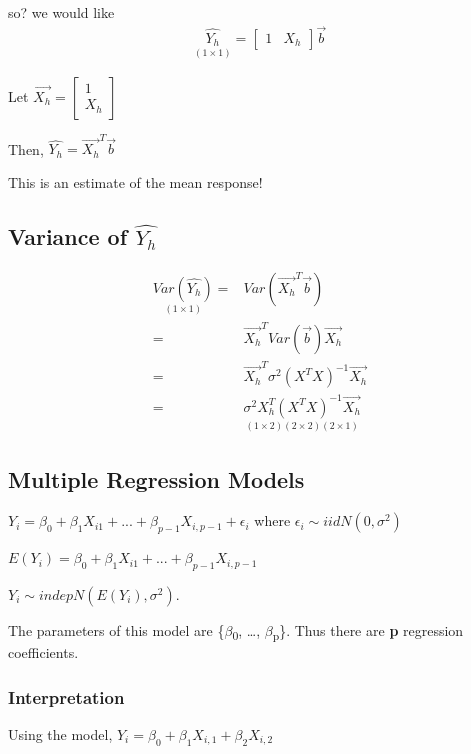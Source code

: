 \documentclass[11pt]{article}
\begin{document}
so? we would like
\begin{equation}
\begin{split}
\underset{(1 \times 1)}{\hat{Y_h}} = \begin{bmatrix}
1 & X_h
\end{bmatrix}
\vec{b}
\end{split}
\end{equation}


Let \(\vec{X_h} = \begin{bmatrix}
1\\
X_h
\end{bmatrix}\)

Then, \(\hat{Y_h} = \vec{X_h}^T \vec{b}\)

This is an estimate of the mean response!
\subsection{Variance of \(\hat{Y_h}\)}
\label{sec:orgf3d23de}
\begin{equation}
  \begin{split}
    \underset{(1 \times 1)}{Var(\hat{Y_h})} = & Var(\vec{X_h}^T \vec{b})\\
                                            = & \vec{X_h}^T Var(\vec{b}) \vec{X_h}\\
                                            = & \vec{X_h}^T \sigma^2(X^T X)^{-1} \vec{X_h}\\
                                            = & \underset{(1 \times 2)(2 \times 2)(2 \times 1)}{\sigma^2 X_h^T (X^T X)^{-1} \vec{X_h}}
  \end{split}
\end{equation}
\subsection{Multiple Regression Models}
\label{sec:org80cce7c}

\(Y_i = \beta_0 + \beta_1 X_{i1} + ... + \beta_{p - 1} X_{i, p - 1} + \epsilon_i\)
where \(\epsilon_i \sim iid N(0, \sigma^2)\)

\(E(Y_i) = \beta_0 + \beta_1 X_{i1} + ... + \beta_{p - 1} X_{i, p - 1}\)

\(Y_i \sim indep N(E(Y_i), \sigma^2)\).

The parameters of this model are \{\(\beta\)\textsubscript{0}, \ldots{}, \(\beta\)\textsubscript{p}\}. Thus there are \textbf{p}
regression coefficients.

\subsubsection{Interpretation}
\label{sec:org4d767e9}
Using the model, \(Y_i = \beta_0 + \beta_1 X_{i,1} + \beta_2 X_{i,2}\)
\end{document}

